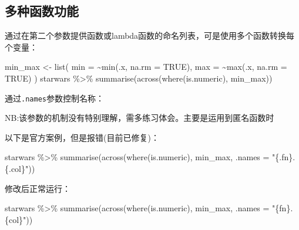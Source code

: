 \documentclass[
]{book}
\newenvironment{Shaded}{\begin{snugshade}}{\end{snugshade}}
\newcommand{\AttributeTok}[1]{\textcolor[rgb]{0.77,0.63,0.00}{#1}}
\newcommand{\ConstantTok}[1]{\textcolor[rgb]{0.00,0.00,0.00}{#1}}
\newcommand{\FunctionTok}[1]{\textcolor[rgb]{0.00,0.00,0.00}{#1}}
\newcommand{\NormalTok}[1]{#1}
\newcommand{\OtherTok}[1]{\textcolor[rgb]{0.56,0.35,0.01}{#1}}
\newcommand{\SpecialCharTok}[1]{\textcolor[rgb]{0.00,0.00,0.00}{#1}}
\newcommand{\StringTok}[1]{\textcolor[rgb]{0.31,0.60,0.02}{#1}}
\begin{document}
\hypertarget{ux591aux79cdux51fdux6570ux529fux80fd}{%
\subsection{多种函数功能}\label{ux591aux79cdux51fdux6570ux529fux80fd}}

通过在第二个参数提供函数或lambda函数的命名列表，可是使用多个函数转换每个变量：

\begin{Shaded}
\begin{Highlighting}[]
\NormalTok{min\_max }\OtherTok{\textless{}{-}} \FunctionTok{list}\NormalTok{(}
  \AttributeTok{min =} \SpecialCharTok{\textasciitilde{}}\FunctionTok{min}\NormalTok{(.x, }\AttributeTok{na.rm =} \ConstantTok{TRUE}\NormalTok{), }
  \AttributeTok{max =} \SpecialCharTok{\textasciitilde{}}\FunctionTok{max}\NormalTok{(.x, }\AttributeTok{na.rm =} \ConstantTok{TRUE}\NormalTok{)}
\NormalTok{)}
\NormalTok{starwars }\SpecialCharTok{\%\textgreater{}\%} \FunctionTok{summarise}\NormalTok{(}\FunctionTok{across}\NormalTok{(}\FunctionTok{where}\NormalTok{(is.numeric), min\_max))}
\end{Highlighting}
\end{Shaded}

通过\texttt{.names}参数控制名称：

NB:该参数的机制没有特别理解，需多练习体会。主要是运用到匿名函数时

以下是官方案例，但是报错(目前已修复)：

\begin{Shaded}
\begin{Highlighting}[]
\NormalTok{starwars }\SpecialCharTok{\%\textgreater{}\%} \FunctionTok{summarise}\NormalTok{(}\FunctionTok{across}\NormalTok{(}\FunctionTok{where}\NormalTok{(is.numeric), min\_max, }\AttributeTok{.names =} \StringTok{"\{.fn\}.\{.col\}"}\NormalTok{))}
\end{Highlighting}
\end{Shaded}

修改后正常运行：

\begin{Shaded}
\begin{Highlighting}[]
\NormalTok{starwars }\SpecialCharTok{\%\textgreater{}\%} \FunctionTok{summarise}\NormalTok{(}\FunctionTok{across}\NormalTok{(}\FunctionTok{where}\NormalTok{(is.numeric), min\_max, }\AttributeTok{.names =} \StringTok{"\{fn\}.\{col\}"}\NormalTok{))}
\end{Highlighting}
\end{Shaded}
\end{document}
